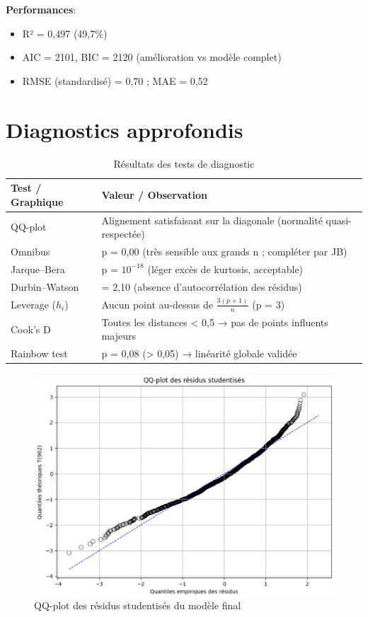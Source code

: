 \documentclass[12pt,a4paper]{article}
\begin{document}
\textbf{Performances}:
\begin{itemize}
    \item R² = 0,497 (49,7\%)
    \item AIC = 2101, BIC = 2120 (amélioration vs modèle complet)
    \item RMSE (standardisé) = 0,70 ; MAE = 0,52
\end{itemize}

\section{Diagnostics approfondis}

\begin{table}[H]
  \centering
  \caption{Résultats des tests de diagnostic}
  \begin{tabular}{ll}
  \toprule
  \textbf{Test / Graphique} & \textbf{Valeur / Observation} \\
  \midrule
  QQ-plot              & Alignement satisfaisant sur la diagonale (normalité quasi-respectée) \\
  Omnibus              & p = 0,00 (très sensible aux grands n ; compléter par JB) \\
  Jarque–Bera          & p = \(10^{-18}\) (léger excès de kurtosis, acceptable) \\
  Durbin–Watson        & = 2,10 (absence d’autocorrélation des résidus) \\
  Leverage (\(h_i\))   & Aucun point au-dessus de \(\tfrac{3(p+1)}{n}\) (p = 3) \\
  Cook’s D             & Toutes les distances < 0,5 → pas de points influents majeurs \\
  Rainbow test         & p = 0,08 (> 0,05) → linéarité globale validée \\
  \bottomrule
  \end{tabular}
\end{table}

\begin{figure}[H]
  \centering
  \includegraphics[width=0.7\linewidth]{qqplot.png}
  \caption{QQ-plot des résidus studentisés du modèle final}
\end{figure}
\end{document}
